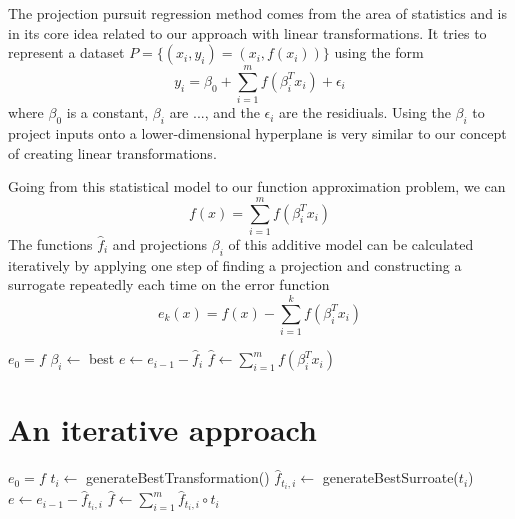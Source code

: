 \documentclass[
  a4paper,  %
  twoside,  %
  bibliography=totoc,
  headsepline,
  cleardoublepage=empty,
  parskip=half,
  draft=false
]{scrbook}
\begin{document}
The projection pursuit regression method comes from the area of statistics and is in its core idea related to our approach with linear transformations.
It tries to represent a dataset $P=\{(x_i, y_i)=(x_i, f(x_i))\}$ using the form
\begin{equation}
y_i=\beta_0 + \sum_{i=1}^m f(\beta_i^T x_i) + \epsilon_i
\end{equation}
where $\beta_0$ is a constant, $\beta_i$ are ..., and the $\epsilon_i$ are the residiuals.
Using the $\beta_i$ to project inputs onto a lower-dimensional hyperplane is very similar to our concept of creating linear transformations.


Going from this statistical model to our function approximation problem, we can 
\begin{equation}
f(x)=\sum_{i=1}^m f(\beta_i^T x_i)
\end{equation}
The functions $\hat{f}_i$ and projections $\beta_i$ of this additive model can be calculated iteratively by applying one step of finding a projection and constructing a surrogate repeatedly each time on the error function
\begin{equation}
e_k(x)=f(x) - \sum_{i=1}^k f(\beta_i^T x_i)
\end{equation}

\begin{algorithm}[H]
\normalsize
\begin{algorithmic}
    \State $e_0 = f$
    	\State $\beta_i \gets$ best
    	\State $e \gets e_{i - 1} - \hat{f}_i$
    \EndFor
    \State $\hat{f} \gets \sum_{i=1}^m f(\beta_i^T x_i)$
    \State {}
\EndFunction
\end{algorithmic}
\end{algorithm}


\section{An iterative approach}

\begin{algorithm}[H]
\normalsize
\begin{algorithmic}
    \State $e_0 = f$
    	\State $t_i \gets$ generateBestTransformation()
    	\State $\hat{f}_{t_i,i} \gets$ generateBestSurroate($t_i$)
    	\State $e \gets e_{i - 1} - \hat{f}_{t_i,i}$
    \EndFor
    \State $\hat{f} \gets \sum_{i=1}^m \hat{f}_{t_i, i} \circ t_i$
    \State {}
\EndFunction
\end{algorithmic}
\end{algorithm}
\end{document}

